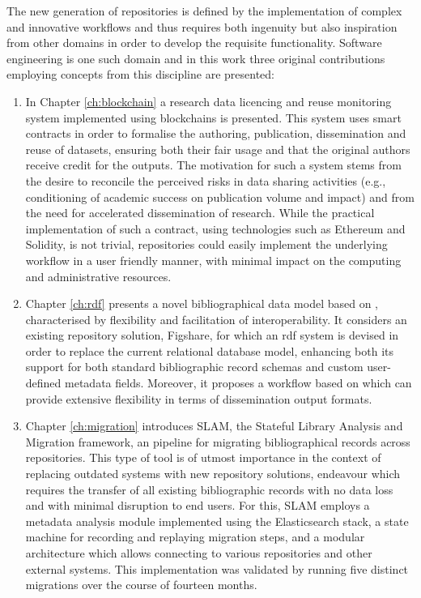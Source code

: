 The new generation of repositories is defined by the implementation of complex and innovative workflows and thus requires both ingenuity but also inspiration from other domains in order to develop the requisite functionality. Software engineering is one such domain and in this work three original contributions employing concepts from this discipline are presented:
\begin{enumerate}
    \item In Chapter \ref{ch:blockchain} a research data licencing and reuse monitoring system implemented using blockchains is presented. This system uses smart contracts in order to formalise the authoring, publication, dissemination and reuse of datasets, ensuring both their fair usage and that the original authors receive credit for the outputs. The motivation for such a system stems from the desire to reconcile the perceived risks in data sharing activities (e.g., conditioning of academic success on publication volume and impact) and from the need for accelerated dissemination of research. While the practical implementation of such a contract, using technologies such as Ethereum and Solidity, is not trivial, repositories could easily implement the underlying workflow in a user friendly manner, with minimal impact on the computing and administrative resources.
    \item Chapter \ref{ch:rdf} presents a novel bibliographical data model based on , characterised by flexibility and facilitation of interoperability. It considers an existing repository solution, Figshare, for which an \gls{rdf} system is devised in order to replace the current relational database model, enhancing both its support for both standard bibliographic record schemas and custom user-defined metadata fields. Moreover, it proposes a workflow based on  which can provide extensive flexibility in terms of dissemination output formats.
    \item Chapter \ref{ch:migration} introduces SLAM, the Stateful Library Analysis and Migration framework, an  pipeline for migrating bibliographical records across repositories. This type of tool is of utmost importance in the context of replacing outdated systems with new repository solutions, endeavour which requires the transfer of all existing bibliographic records with no data loss and with minimal disruption to end users. For this, SLAM employs a metadata analysis module implemented using the Elasticsearch stack, a state machine for recording and replaying migration steps, and a modular architecture which allows connecting to various repositories and other external systems. This implementation was validated by running five distinct migrations over the course of fourteen months.
\end{enumerate}

